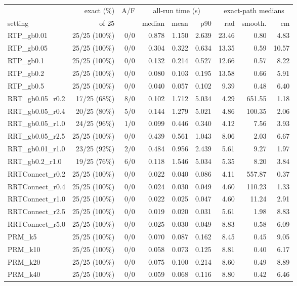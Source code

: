 \begin{tabular}{lrrrrrrrr}\toprule
 & exact (\%) & A/F & \multicolumn{3}{c}{all-run time (s)} & \multicolumn{3}{c}{exact-path medians}\\
setting & of 25 & & median & mean & p90 & rad & smooth. & cm\\\midrule
RTP\_gb0.01 & 25/25 (100\%) & 0/0 & 0.878 & 1.150 & 2.639 & 23.46 & 0.80 & 4.83 \\
RTP\_gb0.05 & 25/25 (100\%) & 0/0 & 0.304 & 0.322 & 0.634 & 13.35 & 0.59 & 10.57 \\
RTP\_gb0.1 & 25/25 (100\%) & 0/0 & 0.132 & 0.214 & 0.527 & 12.66 & 0.57 & 8.22 \\
RTP\_gb0.2 & 25/25 (100\%) & 0/0 & 0.080 & 0.103 & 0.195 & 13.58 & 0.66 & 5.91 \\
RTP\_gb0.5 & 25/25 (100\%) & 0/0 & 0.040 & 0.057 & 0.102 & 9.39 & 0.48 & 6.40 \\
RRT\_gb0.05\_r0.2 & 17/25 (68\%) & 8/0 & 0.102 & 1.712 & 5.034 & 4.29 & 651.55 & 1.18 \\
RRT\_gb0.05\_r0.4 & 20/25 (80\%) & 5/0 & 0.144 & 1.279 & 5.021 & 4.86 & 100.35 & 2.06 \\
RRT\_gb0.05\_r1.0 & 24/25 (96\%) & 1/0 & 0.099 & 0.446 & 0.340 & 4.12 & 7.56 & 3.93 \\
RRT\_gb0.05\_r2.5 & 25/25 (100\%) & 0/0 & 0.439 & 0.561 & 1.043 & 8.06 & 2.03 & 6.67 \\
RRT\_gb0.01\_r1.0 & 23/25 (92\%) & 2/0 & 0.484 & 0.956 & 2.439 & 5.61 & 9.27 & 1.97 \\
RRT\_gb0.2\_r1.0 & 19/25 (76\%) & 6/0 & 0.118 & 1.546 & 5.034 & 5.35 & 8.20 & 3.84 \\
RRTConnect\_r0.2 & 25/25 (100\%) & 0/0 & 0.022 & 0.040 & 0.086 & 4.11 & 557.87 & 0.37 \\
RRTConnect\_r0.4 & 25/25 (100\%) & 0/0 & 0.024 & 0.030 & 0.049 & 4.60 & 110.23 & 1.33 \\
RRTConnect\_r1.0 & 25/25 (100\%) & 0/0 & 0.022 & 0.025 & 0.047 & 4.60 & 11.24 & 2.91 \\
RRTConnect\_r2.5 & 25/25 (100\%) & 0/0 & 0.019 & 0.020 & 0.031 & 5.61 & 1.98 & 8.83 \\
RRTConnect\_r5.0 & 25/25 (100\%) & 0/0 & 0.025 & 0.030 & 0.049 & 8.83 & 0.58 & 6.09 \\
PRM\_k5 & 25/25 (100\%) & 0/0 & 0.070 & 0.087 & 0.162 & 8.45 & 0.45 & 9.05 \\
PRM\_k10 & 25/25 (100\%) & 0/0 & 0.058 & 0.073 & 0.125 & 8.81 & 0.40 & 6.17 \\
PRM\_k20 & 25/25 (100\%) & 0/0 & 0.075 & 0.100 & 0.214 & 8.60 & 0.49 & 8.89 \\
PRM\_k40 & 25/25 (100\%) & 0/0 & 0.059 & 0.068 & 0.116 & 8.80 & 0.42 & 6.46 \\
\bottomrule\end{tabular}
